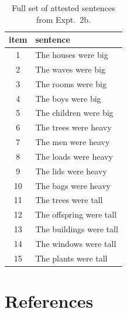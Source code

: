 \documentclass[preprint,12pt,authoryear,titlepage]{elsarticle}
\begin{document}
\begin{table}[htb]
	\renewcommand\thetable{E.2}
	\centering \caption{Full set of attested sentences from Expt.~2b.} 
	\label{expt2bmaterials}
\begin{tabular}{cl}\toprule
item	& 	sentence				\\ \midrule
1	&	The	houses	were	big	\\
2	&	The	waves	were	big	\\
3	&	The	rooms	were	big	\\
4	&	The	boys	were	big	\\
5	&	The	children	were	big	\\
6	&	The	trees	were	heavy	\\
7	&	The	men	were	heavy	\\
8	&	The	loads	were	heavy	\\
9	&	The	lids	were	heavy	\\
10	&	The	bags	were	heavy	\\
11	&	The	trees	were	tall	\\
12	&	The	offspring	were	tall	\\
13	&	The	buildings	were	tall	\\
14	&	The	windows	were	tall	\\
15	&	The	plants	were	tall	\\ \bottomrule
\end{tabular}
\end{table}

\section*{References}

   
  


%
%
%
\end{document}

